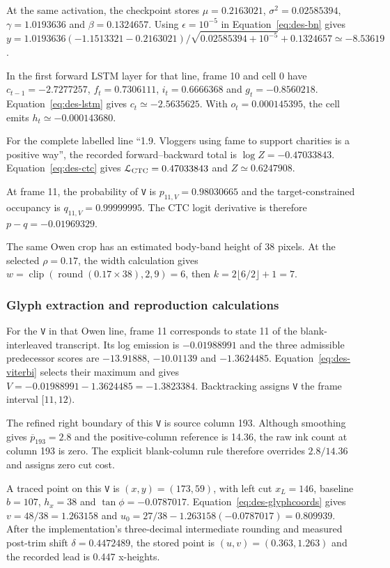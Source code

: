 At the same activation, the checkpoint stores $\mu=0.2163021$, $\sigma^2=0.02585394$, $\gamma=1.0193636$ and $\beta=0.1324657$. Using $\epsilon=10^{-5}$ in Equation~\ref{eq:des-bn} gives $y=1.0193636(-1.1513321-0.2163021)/\sqrt{0.02585394+10^{-5}}+0.1324657\simeq-8.53619$.

In the first forward LSTM layer for that line, frame 10 and cell 0 have $c_{t-1}=-2.7277257$, $f_t=0.7306111$, $i_t=0.6666368$ and $g_t=-0.8560218$. Equation~\ref{eq:des-lstm} gives $c_t\simeq-2.5635625$. With $o_t=0.000145395$, the cell emits $h_t\simeq-0.000143680$.

For the complete labelled line ``1.9. Vloggers using fame to support charities is a positive way'', the recorded forward--backward total is $\log Z=-0.47033843$. Equation~\ref{eq:des-ctc} gives $\mathcal L_{\rm CTC}=0.47033843$ and $Z\simeq0.6247908$.

At frame 11, the probability of \texttt{V} is $p_{11,V}=0.98030665$ and the target-constrained occupancy is $q_{11,V}=0.99999995$. The CTC logit derivative is therefore $p-q=-0.01969329$.

The same Owen crop has an estimated body-band height of 38 pixels. At the selected $\rho=0.17$, the width calculation gives $w=\operatorname{clip}(\operatorname{round}(0.17\times38),2,9)=6$, then $k=2\lfloor6/2\rfloor+1=7$.


\subsubsection{Glyph extraction and reproduction calculations}
For the \texttt{V} in that Owen line, frame 11 corresponds to state 11 of the blank-interleaved transcript. Its log emission is $-0.01988991$ and the three admissible predecessor scores are $-13.91888$, $-10.01139$ and $-1.3624485$. Equation~\ref{eq:des-viterbi} selects their maximum and gives $V=-0.01988991-1.3624485=-1.3823384$. Backtracking assigns \texttt{V} the frame interval $[11,12)$.

The refined right boundary of this \texttt{V} is source column 193. Although smoothing gives $\overline p_{193}=2.8$ and the positive-column reference is 14.36, the raw ink count at column 193 is zero. The explicit blank-column rule therefore overrides $2.8/14.36$ and assigns zero cut cost.

A traced point on this \texttt{V} is $(x,y)=(173,59)$, with left cut $x_L=146$, baseline $b=107$, $h_x=38$ and $\tan\phi=-0.0787017$. Equation~\ref{eq:des-glyphcoords} gives $v=48/38=1.263158$ and $u_0=27/38-1.263158(-0.0787017)=0.809939$. After the implementation's three-decimal intermediate rounding and measured post-trim shift $\delta=0.4472489$, the stored point is $(u,v)=(0.363,1.263)$ and the recorded lead is 0.447 x-heights.

